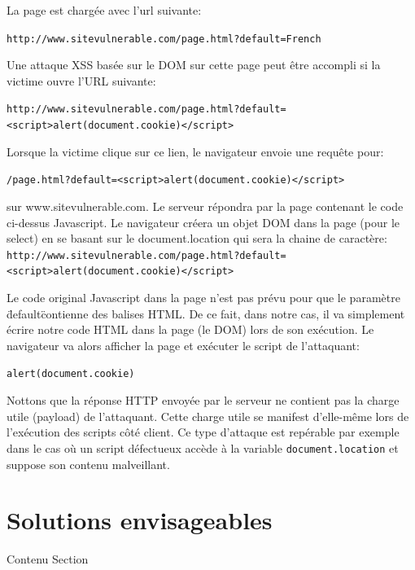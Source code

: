 \documentclass[a4paper,12pt]{report}
\begin{document}
%
%
%
%
%

  La page est chargée avec l'url suivante:

  \lstinline{http://www.sitevulnerable.com/page.html?default=French}

  Une attaque XSS basée sur le DOM sur cette page peut être accompli si la victime ouvre l'URL suivante:

  \lstinline{http://www.sitevulnerable.com/page.html?default=<script>alert(document.cookie)</script>}

  Lorsque la victime clique sur ce lien, le navigateur envoie une requête pour:

  \lstinline{/page.html?default=<script>alert(document.cookie)</script>}

  sur www.sitevulnerable.com. Le serveur répondra par la page contenant le code ci-dessus Javascript. Le navigateur créera un objet DOM dans la page (pour le select) en se basant sur le document.location qui sera la chaine de caractère:
  \lstinline{http://www.sitevulnerable.com/page.html?default=<script>alert(document.cookie)</script>
}

  Le code original Javascript dans la page n'est pas prévu pour que le paramètre \"default\" contienne des balises HTML. De ce fait, dans notre cas, il va simplement écrire notre code HTML dans la page (le DOM) lors de son exécution. Le navigateur va alors afficher la page et exécuter le script de l'attaquant:

  \lstinline{alert(document.cookie)}

  Nottons que la réponse HTTP envoyée par le serveur ne contient pas la charge utile (payload) de l'attaquant. Cette charge utile se manifest d'elle-même lors de l'exécution des scripts côté client. Ce type d'attaque est repérable par exemple dans le cas où un script défectueux accède à la variable \lstinline{document.location} et suppose son contenu malveillant.


    \newpage

  \section{Solutions envisageables}
    Contenu Section
\end{document}
